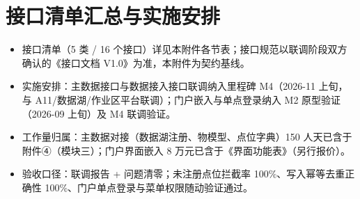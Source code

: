 \documentclass[11pt,a4paper]{ctexart}
\begin{document}
\section{接口清单汇总与实施安排}

\begin{itemize}[leftmargin=*]
  \item 接口清单（5 类 / 16 个接口）详见本附件各节表；接口规范以联调阶段双方确认的《接口文档 V1.0》为准，本附件为契约基线。
  \item 实施安排：主数据接口与数据接入接口联调纳入里程碑 M4（2026-11 上旬，与 A11/数据湖/作业区平台联调）；门户嵌入与单点登录纳入 M2 原型验证（2026-09 上旬）及 M4 联调验证。
  \item 工作量归属：主数据对接（数据湖注册、物模型、点位字典）150 人天已含于附件④（模块三）；门户界面嵌入 8 万元已含于《界面功能表》（另行报价）。
  \item 验收口径：联调报告 + 问题清零；未注册点位拦截率 100\%、写入幂等去重正确性 100\%、门户单点登录与菜单权限随动验证通过。
\end{itemize}
\end{document}
